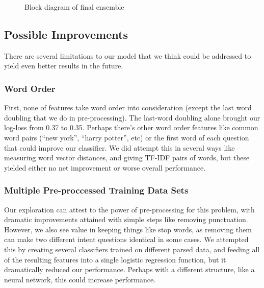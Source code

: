 \documentclass{article}
\begin{document}
\begin{figure}[h]
    \centering  
    \caption{Block diagram of final ensemble}
\end{figure}

\subsection{Possible Improvements}
There are several limitations to our model that we think could be addressed to
yield even better results in the future.

\subsubsection{Word Order} First, none of features take word order into
consideration (except the last word doubling that we do in pre-processing). The
last-word doubling alone brought our log-loss from 0.37 to 0.35. Perhaps there’s
other word order features like common word pairs (“new york”, “harry potter”,
etc) or the first word of each question that could improve our classifier. We
did attempt this in several ways like measuring word vector distances, and
giving TF-IDF pairs of words, but these yielded either no net improvement or
worse overall performance.

\subsubsection{Multiple Pre-proccessed Training Data Sets}

Our exploration can attest to the power of pre-processing for this problem, with
dramatic improvements attained with simple steps like removing punctuation.
However, we also see value in keeping things like stop words, as removing them
can make two different intent questions identical in some cases. We attempted
this by creating several classifiers trained on different parsed data, and
feeding all of the resulting features into a single logistic regression
function, but it dramatically reduced our performance. Perhaps with a different
structure, like a neural network, this could increase performance.
\end{document}

